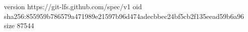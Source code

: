 version https://git-lfs.github.com/spec/v1
oid sha256:855959b786579a471989e21597b96d474adecbbec24bf5cb2f135eead59b6a96
size 87544
